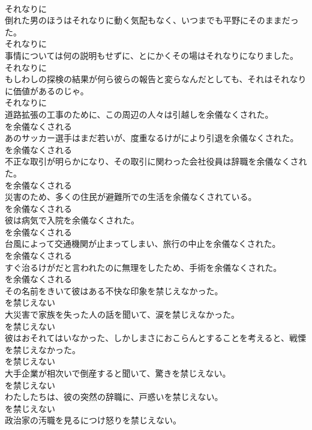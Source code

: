 \documentclass[8pt]{extreport}
\begin{document}
\begin{CJK}{UTF8}{min}
\\	それなりに
\\	倒れた男のほうはそれなりに動く気配もなく、いつまでも平野にそのままだった。	
\\	それなりに
\\	事情については何の説明もせずに、とにかくその場はそれなりになりました。	
\\	それなりに
\\	もしわしの探検の結果が何ら彼らの報告と変らなんだとしても、それはそれなりに価値があるのじゃ。	
\\	それなりに
\\	道路拡張の工事のために、この周辺の人々は引越しを余儀なくされた。	
\\	を余儀なくされる
\\	あのサッカー選手はまだ若いが、度重なるけがにより引退を余儀なくされた。	
\\	を余儀なくされる
\\	不正な取引が明らかになり、その取引に関わった会社役員は辞職を余儀なくされた。	
\\	を余儀なくされる
\\	災害のため、多くの住民が避難所での生活を余儀なくされている。	
\\	を余儀なくされる
\\	彼は病気で入院を余儀なくされた。	
\\	を余儀なくされる
\\	台風によって交通機関が止まってしまい、旅行の中止を余儀なくされた。	
\\	を余儀なくされる
\\	すぐ治るけがだと言われたのに無理をしたため、手術を余儀なくされた。	
\\	を余儀なくされる
\\	その名前をきいて彼はある不快な印象を禁じえなかった。	
\\	を禁じえない
\\	大災害で家族を失った人の話を聞いて、涙を禁じえなかった。	
\\	を禁じえない
\\	彼はおそれてはいなかった、しかしまさにおこらんとすることを考えると、戦慄を禁じえなかった。	
\\	を禁じえない
\\	大手企業が相次いで倒産すると聞いて、驚きを禁じえない。	
\\	を禁じえない
\\	わたしたちは、彼の突然の辞職に、戸惑いを禁じえない。	
\\	を禁じえない
\\	政治家の汚職を見るにつけ怒りを禁じえない。	

\end{CJK}
\end{document}
